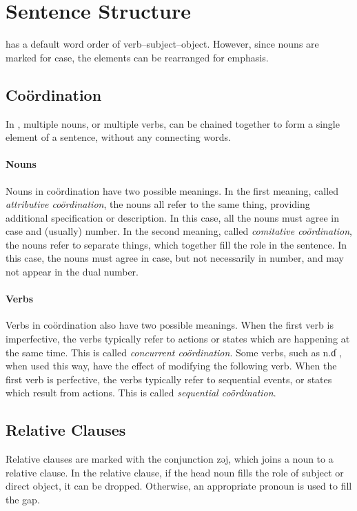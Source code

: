 \section{Sentence Structure}
\Langname{} has a default word order of verb--subject--object. However, since
nouns are marked for case, the elements can be rearranged for emphasis.

\subsection{Coördination}
In \Langname, multiple nouns, or multiple verbs, can be chained together to
form a single element of a sentence, without any connecting words.

\paragraph{Nouns} Nouns in coördination have two possible meanings. In the
first meaning, called {\em attributive coördination}, the nouns all refer
to the same thing, providing additional specification or description. In this
case, all the nouns must agree in case and (usually) number. In the second
meaning, called {\em comitative coördination}, the nouns refer to separate
things, which together fill the role in the sentence.  In this case, the nouns
must agree in case, but not necessarily in number, and may not appear in the
dual number.

\paragraph{Verbs} Verbs in coördination also have two possible meanings. When
the first verb is imperfective, the verbs typically refer to actions or states
which are happening at the same time. This is called {\em concurrent
    coördination}. Some verbs, such as {\ll n.ɗ} , when used
this way, have the effect of modifying the following verb.  When the first verb
is perfective, the verbs typically refer to sequential events, or states which
result from actions. This is called {\em sequential coördination}.

\subsection{Relative Clauses}
Relative clauses are marked with the conjunction {\ll zəj}, which joins a noun
to a relative clause. In the relative clause, if the head noun fills the role
of subject or direct object, it can be dropped. Otherwise, an appropriate
pronoun is used to fill the gap.

